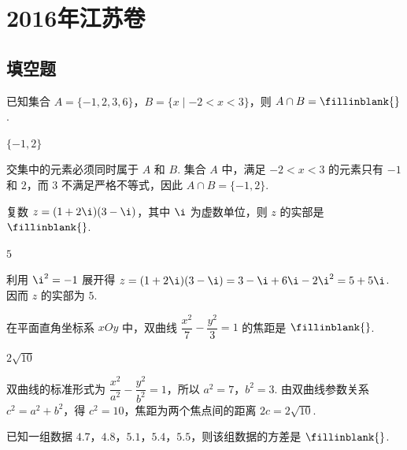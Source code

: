 
\chapter{2016年江苏卷}

\section{填空题}

\begin{problem}
已知集合 \(A=\{-1,2,3,6\}\)，\(B=\{x\mid -2<x<3\}\)，则 \(A\cap B=\fillinblank{}\).
\end{problem}

\begin{answer}
\(\{-1,2\}\)
\end{answer}

\begin{solution}
交集中的元素必须同时属于 \(A\) 和 \(B\). 集合 \(A\) 中，满足 \(-2<x<3\) 的元素只有 \(-1\) 和 \(2\)，而 \(3\) 不满足严格不等式，因此 \(A\cap B=\{-1,2\}\).
\end{solution}

\begin{problem}
复数 \(z=(1+2\i)(3-\i)\)，其中 \(\i\) 为虚数单位，则 \(z\) 的实部是 \(\fillinblank{}\).
\end{problem}

\begin{answer}
\(5\)
\end{answer}

\begin{solution}
利用 \(\i^2=-1\) 展开得 \(z=(1+2\i)(3-\i)=3-\i+6\i-2\i^2=5+5\i\). 因而 \(z\) 的实部为 \(5\).
\end{solution}

\begin{problem}
在平面直角坐标系 \(xOy\) 中，双曲线 \(\dfrac{x^2}{7}-\dfrac{y^2}{3}=1\) 的焦距是 \(\fillinblank{}\).
\end{problem}

\begin{answer}
\(2\sqrt{10}\)
\end{answer}

\begin{solution}
双曲线的标准形式为 \(\dfrac{x^2}{a^2}-\dfrac{y^2}{b^2}=1\)，所以 \(a^2=7\)，\(b^2=3\). 由双曲线参数关系 \(c^2=a^2+b^2\)，得 \(c^2=10\)，焦距为两个焦点间的距离 \(2c=2\sqrt{10}\).
\end{solution}

\begin{problem}
已知一组数据 \(4.7\)，\(4.8\)，\(5.1\)，\(5.4\)，\(5.5\)，则该组数据的方差是 \(\fillinblank{}\).
\end{problem}

